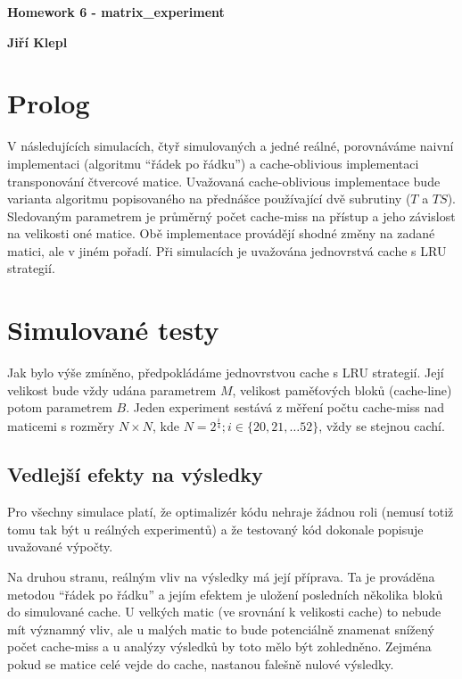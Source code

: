 \documentclass[a4paper,12pt]{article} %
\begin{document}
\thispagestyle{empty} %

\begin{center}
	{\Large \bf Homework 6 - matrix\_experiment}
	\vspace{2mm}

	{\bf Jiří Klepl}

\end{center}

\vspace{0.4cm}


\setlength{\parindent}{2em}

\section*{Prolog}

V následujících simulacích, čtyř simulovaných a jedné reálné, porovnáváme naivní implementaci (algoritmu ``řádek po řádku'') a cache-oblivious implementaci transponování čtvercové matice. Uvažovaná cache-oblivious implementace bude varianta algoritmu popisovaného na přednášce používající dvě subrutiny ($T$ a $TS$). Sledovaným parametrem je průměrný počet cache-miss na přístup a jeho závislost na velikosti oné matice. Obě implementace provádějí shodné změny na zadané matici, ale v jiném pořadí. Při simulacích je uvažována jednovrstvá cache s LRU strategií.

\section*{Simulované testy}

Jak bylo výše zmíněno, předpokládáme jednovrstvou cache s LRU strategií. Její velikost bude vždy udána parametrem $M$, velikost paměťových bloků (cache-line) potom parametrem $B$. Jeden experiment sestává z měření počtu cache-miss nad maticemi s rozměry $N \times N$, kde $N = 2^{\frac{i}{4}}; i \in \{20, 21, \dots 52\}$, vždy se stejnou cachí.

\subsection*{Vedlejší efekty na výsledky}

Pro všechny simulace platí, že optimalizér kódu nehraje žádnou roli (nemusí totiž tomu tak být u reálných experimentů) a že testovaný kód dokonale popisuje uvažované výpočty.

Na druhou stranu, reálným vliv na výsledky má její příprava. Ta je prováděna metodou ``řádek po řádku'' a jejím efektem je uložení posledních několika bloků do simulované cache. U velkých matic (ve srovnání k velikosti cache) to nebude mít významný vliv, ale u malých matic to bude potenciálně znamenat snížený počet cache-miss a u analýzy výsledků by toto mělo být zohledněno. Zejména pokud se matice celé vejde do cache, nastanou falešně nulové výsledky.
\end{document}
